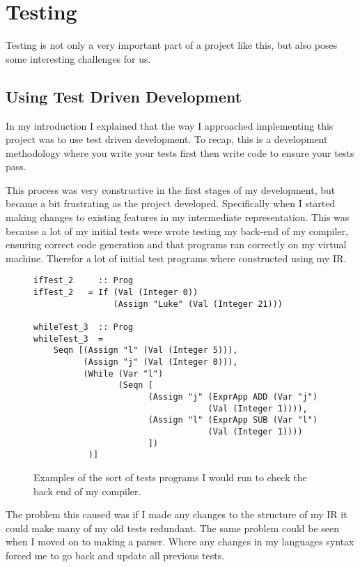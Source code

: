 
\chapter{Testing}

Testing is not only a very important part of a project like this, but also poses some interesting challenges for us.

\section{Using Test Driven Development}

In my introduction I explained that the way I approached implementing this project was to use test driven development. To recap, this is a development methodology where you write your tests first then write code to ensure your tests pass.

This process was very constructive in the first stages of my development, but became a bit frustrating as the project developed. Specifically when I started making changes to existing features in my intermediate representation. This was because a lot of my initial tests were wrote testing my back-end of my compiler, ensuring correct code generation and that programs ran correctly on my virtual machine. Therefor a lot of initial test programs where constructed using my IR. 


\begin{figure}[h]
\centering
\begin{lstlisting}
ifTest_2     :: Prog     
ifTest_2   = If (Val (Integer 0)) 
                (Assign "Luke" (Val (Integer 21)))

whileTest_3  :: Prog      
whileTest_3  = 
    Seqn [(Assign "l" (Val (Integer 5))), 
          (Assign "j" (Val (Integer 0))), 
          (While (Var "l") 
                 (Seqn [
                       (Assign "j" (ExprApp ADD (Var "j") 
                                   (Val (Integer 1)))),
                       (Assign "l" (ExprApp SUB (Var "l") 
                                   (Val (Integer 1))))
                       ])
           )]
\end{lstlisting}
\caption{Examples of the sort of tests programs I would run to check the back end of my compiler.}
\label{fig:egEarlyTests} 
\end{figure}  

The problem this caused was if I made any changes to the structure of my IR it could make many of my old tests redundant. The same problem could be seen when I moved on to making a parser. Where any changes in my languages syntax forced me to go back and update all previous tests.

